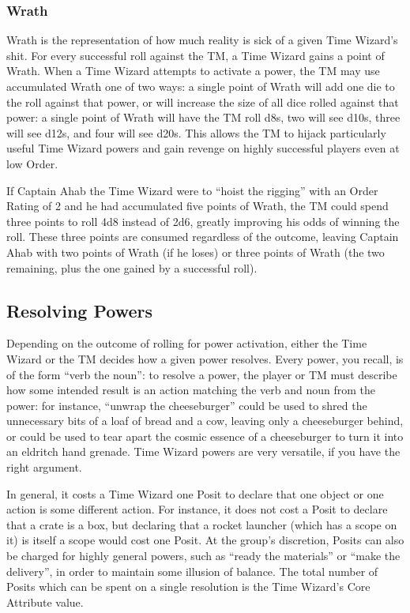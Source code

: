 \documentclass{article}
\begin{document}
\subsubsection{Wrath} \label{sssec:wrath}
Wrath is the representation of how much reality is sick of a given Time Wizard's shit. For
every successful roll against the TM, a Time Wizard gains a point of Wrath. When a Time Wizard
attempts to activate a power, the TM may use accumulated Wrath one of two ways: a single point
of Wrath will add one die to the roll against that power, or will increase the size of all dice
rolled against that power: a single point of Wrath will have the TM roll d8s, two will see
d10s, three will see d12s, and four will see d20s. This allows the TM to hijack particularly
useful Time Wizard powers and gain revenge on highly successful players even at low Order.

If Captain Ahab the Time Wizard were to ``hoist the rigging'' with an Order Rating of 2 and he
had accumulated five points of Wrath, the TM could spend three points to roll 4d8 instead of
2d6, greatly improving his odds of winning the roll. These three points are consumed regardless
of the outcome, leaving Captain Ahab with two points of Wrath (if he loses) or three points of
Wrath (the two remaining, plus the one gained by a successful roll).

\subsection{Resolving Powers} \label{ssec:resolve-power}
Depending on the outcome of rolling for power activation, either the Time Wizard or the TM
decides how a given power resolves. Every power, you recall, is of the form ``verb the noun'':
to resolve a power, the player or TM must describe how some intended result is an action
matching the verb and noun from the power: for instance, ``unwrap the cheeseburger'' could be
used to shred the unnecessary bits of a loaf of bread and a cow, leaving only a cheeseburger
behind, or could be used to tear apart the cosmic essence of a cheeseburger to turn it into
an eldritch hand grenade. Time Wizard powers are very versatile, if you have the right argument.

In general, it costs a Time Wizard one Posit to declare that one object or one action is some
different action. For instance, it does not cost a Posit to declare that a crate is a box, but
declaring that a rocket launcher (which has a scope on it) is itself a scope would cost one
Posit. At the group's discretion, Posits can also be charged for highly general powers, such as
``ready the materials'' or ``make the delivery'', in order to maintain some illusion of balance.
The total number of Posits which can be spent on a single resolution is the Time Wizard's Core
Attribute value.
\end{document}
